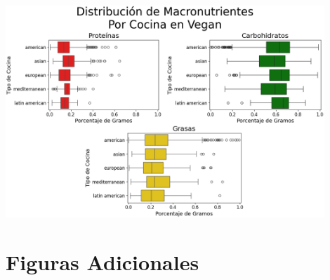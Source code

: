 \documentclass[12pt,a4paper]{article}
\begin{document}
{{{            \begin{center}
                \includegraphics[width=0.9\textwidth]{Resources/EDA/Vegan_2.png}
            \end{center}   
            }
        }

        

        \newpage

        \section{Figuras Adicionales}\label{anexo:B}
        {
}}
\end{document}
